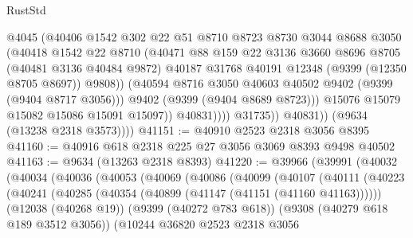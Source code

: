 \begin{lexlean}{RustStd}
\begin{coremodule}
                            @4045
                            (@40406
                              @1542
                              @302
                              @22
                              @51
                              @8710
                              @8723
                              @8730
                              @3044
                              @8688
                              @3050
                              (@40418
                                @1542
                                @22
                                @8710
                                (@40471
                                  @88
                                  @159
                                  @22
                                  @3136
                                  @3660
                                  @8696
                                  @8705
                                  (@40481 @3136 @40484 @9872)
                                  @40187
                                  @31768
                                  @40191
                                  @12348
                                  (@9399 (@12350 @8705 @8697))
                                  @9808))
                              (@40594 @8716 @3050 @40603 @40502 @9402 (@9399 (@9404 @8717 @3056)))
                              @9402
                              (@9399 (@9404 @8689 @8723)))
                            @15076
                            @15079
                            @15082
                            @15086
                            @15091
                            @15097))
                        @40831))))
                @31735))
            @40831))
        (@9634 (@13238 @2318 @3573))))
@41151 := @40910 @2523 @2318 @3056 @8395
@41160 := @40916 @618 @2318 @225 @27 @3056 @3069 @8393 @9498 @40502
@41163 := @9634 (@13263 @2318 @8393)
@41220 := @39966
    (@39991
      (@40032
        (@40034
          (@40036
            (@40053
              (@40069
                (@40086
                  (@40099
                    (@40107
                      (@40111
                        (@40223
                          (@40241
                            (@40285 (@40354 (@40899 (@41147 (@41151 (@41160 @41163))))))
                            (@12038 (@40268 @19))
                            (@9399 (@40272 @783 @618))
                            (@9308 (@40279 @618 @189 @3512 @3056))
                            (@10244
                              @36820
                              @2523
                              @2318
                              @3056

\end{coremodule}
\end{lexlean}
